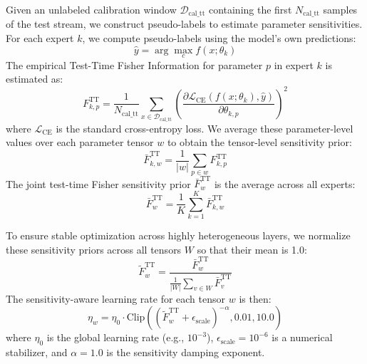 \documentclass{article}
\theoremstyle{plain}
\theoremstyle{definition}
\theoremstyle{remark}
\begin{document}
Given an unlabeled calibration window $\mathcal{D}_{\text{cal\_tt}}$ containing the first $N_{\text{cal\_tt}}$ samples of the test stream, we construct pseudo-labels to estimate parameter sensitivities. For each expert $k$, we compute pseudo-labels using the model's own predictions:
\begin{equation}
\hat{y} = \arg\max_{c} f(x; \theta_k)
\end{equation}
The empirical Test-Time Fisher Information for parameter $p$ in expert $k$ is estimated as:
\begin{equation}
F_{k, p}^{\text{TT}} = \frac{1}{N_{\text{cal\_tt}}} \sum_{x \in \mathcal{D}_{\text{cal\_tt}}} \left( \frac{\partial \mathcal{L}_{\text{CE}}(f(x; \theta_k), \hat{y})}{\partial \theta_{k, p}} \right)^2
\end{equation}
where $\mathcal{L}_{\text{CE}}$ is the standard cross-entropy loss. We average these parameter-level values over each parameter tensor $w$ to obtain the tensor-level sensitivity prior:
\begin{equation}
\bar{F}_{k, w}^{\text{TT}} = \frac{1}{|w|} \sum_{p \in w} F_{k, p}^{\text{TT}}
\end{equation}
The joint test-time Fisher sensitivity prior $\bar{F}_w^{\text{TT}}$ is the average across all experts:
\begin{equation}
\bar{F}_w^{\text{TT}} = \frac{1}{K} \sum_{k=1}^K \bar{F}_{k, w}^{\text{TT}}
\end{equation}

To ensure stable optimization across highly heterogeneous layers, we normalize these sensitivity priors across all tensors $W$ so that their mean is 1.0:
\begin{equation}
\tilde{F}_w^{\text{TT}} = \frac{\bar{F}_w^{\text{TT}}}{\frac{1}{|W|}\sum_{v \in W} \bar{F}_v^{\text{TT}}}
\end{equation}
The sensitivity-aware learning rate for each tensor $w$ is then:
\begin{equation}
\eta_w = \eta_0 \cdot \text{Clip}\left( (\tilde{F}_w^{\text{TT}} + \epsilon_{\text{scale}})^{-\alpha}, 0.01, 10.0 \right)
\end{equation}
where $\eta_0$ is the global learning rate (e.g., $10^{-3}$), $\epsilon_{\text{scale}} = 10^{-6}$ is a numerical stabilizer, and $\alpha = 1.0$ is the sensitivity damping exponent.
\end{document}
